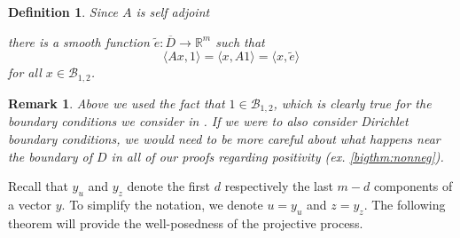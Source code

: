 \documentclass[final]{amsart}
\newtheorem{deff}[thm]{Definition}
\newtheorem{rem}[thm]{Remark}
\numberwithin{thm}{section}
\numberwithin{equation}{section}
\newcommand{\R}{\mathbb{R}}
\newcommand{\ip}[2]{\langle #1, #2 \rangle}
\newcommand{\B}{\mathcal{B}}
\begin{document}
\begin{deff}\label{def:tilde-e}
    Since $A$ is self adjoint
    
    there is a smooth function $\tilde e: \overline D \to \R^m$ such that
    $$\ip{Ax}{1} = \ip{x}{A1} = 
     \ip{x}{\tilde e}$$
    for all $x \in \B_{1,2}$.
    
\end{deff}

\begin{rem}
    Above we used the fact that $1 \in \B_{1,2}$, which is clearly true for the boundary conditions we consider in . If we were to also consider Dirichlet boundary conditions, we would need to be more careful about what happens near the boundary of $D$ in all of our proofs regarding positivity (ex. \ref{bigthm:nonneg}).
\end{rem}

Recall that $y_u$ and $y_z$ denote the first $d$ respectively the last $m-d$ components of a vector $y$. To simplify the notation, we denote $u = y_u$
and $z = y_z$. The following theorem will provide the well-posedness of the projective process. 
\end{document}
